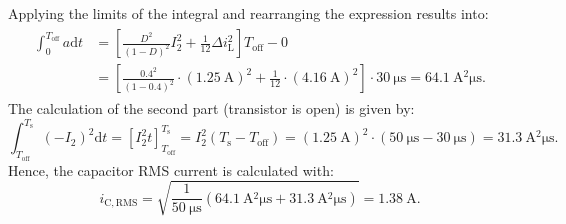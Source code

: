 \begin{solutionblock}
\begin{align}
\begin{split}
        \end{split}
    \end{align}
    Applying the limits of the integral and rearranging the expression results into:
    \begin{align}
        \begin{split}
        \int_{0}^{T_{\mathrm{off}}} a \mathrm{d}t &= \left[\frac{D^2}{\left(1-D\right)^2}I_2^2 + \frac{1}{12} \Delta i_{\mathrm{L}}^2 \right] T_{\mathrm{off}} - 0 \\
        &= \left[\frac{0.4^2}{\left(1-0.4\right)^2} \cdot \left(\SI{1.25}{\ampere}\right)^2 + \frac{1}{12}\cdot \left(\SI{4.16}{\ampere}\right)^2 \right] \cdot \SI{30}{\micro\second} = \SI{64.1}{\ampere^2\micro\second}.
        \end{split}
    \end{align}
    The calculation of the second part (transistor is open) is given by:
    \begin{equation}
        \int_{T_{\mathrm{off}}}^{T_{\mathrm{s}}} \left(-I_2 \right)^2 \mathrm{d}t = \left[I_2^2 t \right]_{T_{\mathrm{off}}}^{T_{\mathrm{s}}} = I_2^2 \left(T_{\mathrm{s}} - T_{\mathrm{off}}\right) = (\SI{1.25}{\ampere})^2 \cdot (\SI{50}{\micro\second} - \SI{30}{\micro\second}) = \SI{31.3}{\ampere^2\micro\second}.
    \end{equation}
    Hence, the capacitor RMS current is calculated with:
    \begin{equation}
        i_{\mathrm{C,RMS}} = \sqrt{\frac{1}{\SI{50}{\micro\second}} \left(\SI{64.1}{\ampere^2\micro\second} + \SI{31.3}{\ampere^2\micro\second}\right)} = \SI{1.38}{\ampere}.
    \end{equation}
\end{solutionblock}


